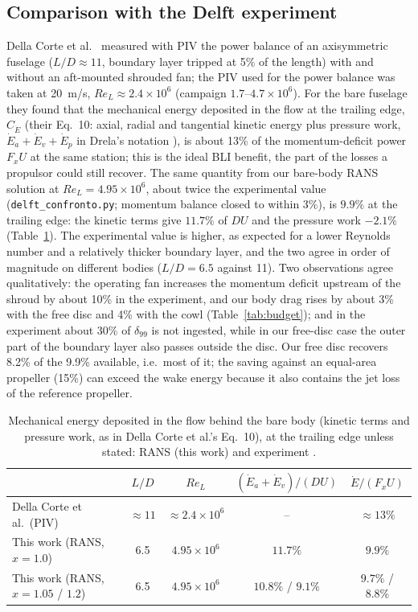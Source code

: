 \documentclass[11pt,a4paper]{article}
\newcommand{\ReL}{\mathit{Re}_L}
\begin{document}
\subsection{Comparison with the Delft experiment}\label{sec:delft}
Della Corte et al.\ \cite{dellacorte2021} measured with PIV the power balance of an
axisymmetric fuselage ($L/D\approx11$, boundary layer tripped at 5\% of the length) with and
without an aft-mounted shrouded fan; the PIV used for the power balance was taken at 20~m/s,
$\ReL\approx2.4\times10^6$ (campaign $1.7$--$4.7\times10^6$). For the bare fuselage they found that
the mechanical energy deposited in the flow at the trailing edge, $C_{\dot E}$ (their Eq.~10:
axial, radial and tangential kinetic energy plus pressure work, $\dot E_a+\dot E_v+\dot E_p$ in
Drela's notation \cite{drela2009}), is about 13\% of the momentum-deficit power $F_xU$ at the same
station; this is the ideal BLI benefit, the part of the losses a propulsor could still recover.
The same quantity from our bare-body RANS solution at $\ReL=4.95\times10^6$, about twice the
experimental value (\texttt{delft\_confronto.py}; momentum balance closed to within 3\%), is
$9.9\%$ at the trailing edge: the kinetic terms give $11.7\%$ of $DU$ and the pressure work
$-2.1\%$ (Table~\ref{tab:delft}). The experimental value is higher, as expected for a lower
Reynolds number and a relatively thicker boundary layer, and the two agree in order of
magnitude on different bodies ($L/D=6.5$ against 11). Two observations agree qualitatively: the
operating fan increases the momentum deficit upstream of the shroud by about 10\% in the
experiment, and our body drag rises by about 3\% with the free disc and 4\% with the cowl
(Table~\ref{tab:budget}); and in the experiment about 30\% of $\delta_{99}$ is not ingested,
while in our free-disc case the outer part of the boundary layer also passes outside the disc.
Our free disc recovers 8.2\% of the 9.9\% available, i.e.\ most of it; the saving against an
equal-area propeller (15\%) can exceed the wake energy because it also contains the jet loss
of the reference propeller.

\begin{table}[h]\centering
\caption{Mechanical energy deposited in the flow behind the bare body (kinetic terms and
pressure work, as in Della Corte et al.'s Eq.~10), at the trailing edge unless stated: RANS
(this work) and experiment \cite{dellacorte2021}.}\label{tab:delft}
\small\setlength{\tabcolsep}{4pt}
\begin{tabular}{lcccc}
\toprule
 & $L/D$ & $\ReL$ & $(\dot E_a+\dot E_v)/(DU)$ & $\dot E/(F_xU)$\\
\midrule
Della Corte et al.\ (PIV) & $\approx11$ & $\approx2.4\times10^6$ & -- & $\approx13\%$\\
This work (RANS, $x=1.0$) & 6.5 & $4.95\times10^6$ & $11.7\%$ & $9.9\%$\\
This work (RANS, $x=1.05$ / $1.2$) & 6.5 & $4.95\times10^6$ & $10.8\%$ / $9.1\%$ & $9.7\%$ / $8.8\%$\\
\bottomrule
\end{tabular}
\end{table}
\end{document}
